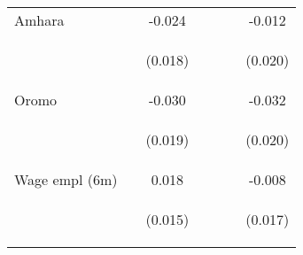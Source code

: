 \begin{tabular}{lcccccc}
\noalign{\smallskip}Amhara &  & -0.024 &  &  &  & -0.012\\
 & \begin{footnotesize}\end{footnotesize} & \begin{footnotesize}(0.018)\end{footnotesize} & \begin{footnotesize}\end{footnotesize} & \begin{footnotesize}\end{footnotesize} & \begin{footnotesize}\end{footnotesize} & \begin{footnotesize}(0.020)\end{footnotesize}\\
\noalign{\smallskip}Oromo &  & -0.030 &  &  &  & -0.032\\
 & \begin{footnotesize}\end{footnotesize} & \begin{footnotesize}(0.019)\end{footnotesize} & \begin{footnotesize}\end{footnotesize} & \begin{footnotesize}\end{footnotesize} & \begin{footnotesize}\end{footnotesize} & \begin{footnotesize}(0.020)\end{footnotesize}\\
\noalign{\smallskip}Wage empl (6m) &  & 0.018 &  &  &  & -0.008\\
 & \begin{footnotesize}\end{footnotesize} & \begin{footnotesize}(0.015)\end{footnotesize} & \begin{footnotesize}\end{footnotesize} & \begin{footnotesize}\end{footnotesize} & \begin{footnotesize}\end{footnotesize} & \begin{footnotesize}(0.017)\end{footnotesize}\\

\end{tabular}
